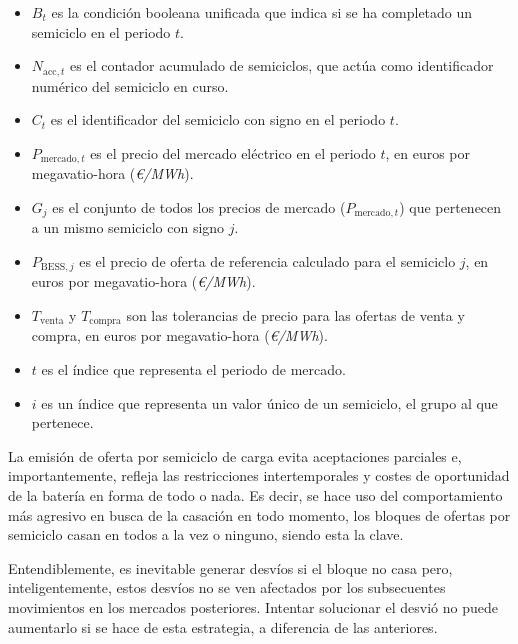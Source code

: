 \begin{itemize}
  \item \( B_{t} \) es la condición booleana unificada que indica si se ha completado un semiciclo en el periodo \( t \).

  \item \( N_{\text{acc}, t} \) es el contador acumulado de semiciclos, que actúa como identificador numérico del semiciclo en curso.

  \item \( C_{t} \) es el identificador del semiciclo con signo en el periodo \( t \).

  \item \( P_{\text{mercado}, t} \) es el precio del mercado eléctrico en el periodo \( t \), en euros por megavatio-hora (\textit{€/MWh}).

  \item \( G_{j} \) es el conjunto de todos los precios de mercado (\( P_{\text{mercado}, t} \)) que pertenecen a un mismo semiciclo con signo \( j \).

  \item \( P_{\text{BESS}, j} \) es el precio de oferta de referencia calculado para el semiciclo \( j \), en euros por megavatio-hora (\textit{€/MWh}).

  \item \( T_{\text{venta}} \) y \( T_{\text{compra}} \) son las tolerancias de precio para las ofertas de venta y compra, en euros por megavatio-hora (\textit{€/MWh}).

  \item \( t \) es el índice que representa el periodo de mercado.

  \item \( i \) es un índice que representa un valor único de un semiciclo, el grupo al que pertenece.

\end{itemize}

La emisión de oferta por semiciclo de carga evita aceptaciones parciales e, importantemente, refleja las restricciones intertemporales y costes de oportunidad de la batería en forma de todo o nada. Es decir, se hace uso del comportamiento más agresivo en busca de la casación en todo momento, los bloques de ofertas por semiciclo casan en todos a la vez o ninguno, siendo esta la clave.

Entendiblemente, es inevitable generar desvíos si el bloque no casa pero, inteligentemente, estos desvíos no se ven afectados por los subsecuentes movimientos en los mercados posteriores. Intentar solucionar el desvió no puede aumentarlo si se hace de esta estrategia, a diferencia de las anteriores.

